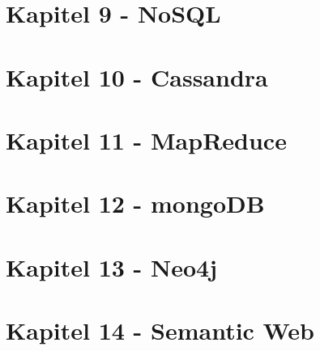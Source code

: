 \documentclass[a4paper,11pt]{article}
\begin{document}
\section{Kapitel 9 - NoSQL}
\section{Kapitel 10 - Cassandra}
\section{Kapitel 11 - MapReduce}
\section{Kapitel 12 - mongoDB}
\section{Kapitel 13 - Neo4j}
\section{Kapitel 14 - Semantic Web}
\end{document}
